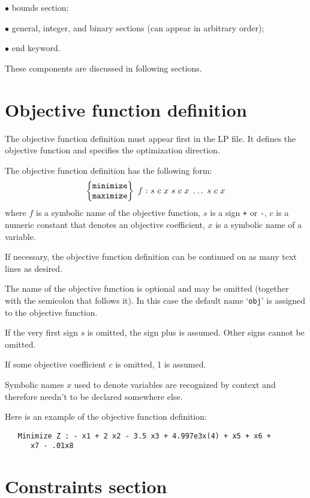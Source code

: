 $\bullet$ bounds section;

$\bullet$ general, integer, and binary sections (can appear in arbitrary
order);

$\bullet$ end keyword.

These components are discussed in following sections.

\section{Objective function definition}

The objective function definition must appear first in the LP file. It
defines the objective function and specifies the optimization direction.

The objective function definition has the following form:
$$
\left\{
\begin{array}{@{}c@{}}
{\tt minimize} \\ {\tt maximize}
\end{array}
\right\}\ f\ {\tt :}\ s\ c\ x\ s\ c\ x\ \dots\ s\ c\ x
$$
where $f$ is a symbolic name of the objective function, $s$ is a sign
\verb|+| or \verb|-|, $c$ is a numeric constant that denotes an
objective coefficient, $x$ is a symbolic name of a variable.

If necessary, the objective function definition can be continued on as
many text lines as desired.

The name of the objective function is optional and may be omitted
(together with the semicolon that follows it). In this case the default
name `\verb|obj|' is assigned to the objective function.

If the very first sign $s$ is omitted, the sign plus is assumed. Other
signs cannot be omitted.

If some objective coefficient $c$ is omitted, 1 is assumed.

Symbolic names $x$ used to denote variables are recognized by context
and therefore needn't to be declared somewhere else.

Here is an example of the objective function definition:

\begin{verbatim}
   Minimize Z : - x1 + 2 x2 - 3.5 x3 + 4.997e3x(4) + x5 + x6 +
      x7 - .01x8
\end{verbatim}

\section{Constraints section}

